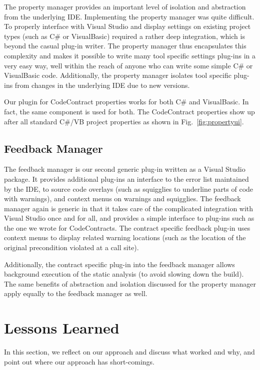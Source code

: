 \documentclass[10pt, conference, compsocconf]{IEEEtran}
\newcommand{\csharp}{C\#}
\begin{document}
The property manager provides an important level of isolation and
abstraction from the underlying IDE. Implementing the property manager
was quite difficult. To properly interface with Visual Studio and
display settings on existing project types (such as \csharp{} or
VisualBasic) required a rather deep integration, which is beyond the
casual plug-in writer. The property manager thus encapsulates this
complexity and makes it possible to write many tool specific settings
plug-ins in a very easy way, well within the reach of anyone who can
write some simple \csharp{} or VisualBasic code. Additionally, the
property manager isolates tool specific plug-ins from changes in
the underlying IDE due to new versions. 

Our plugin for CodeContract properties works for both \csharp{} and
VisualBasic. In fact, the same component is used for both.  The CodeContract
properties show up after all standard \csharp{}/VB project properties as shown in Fig.~\ref{fig:propertyui}.

\subsection{Feedback Manager}
The feedback manager is our second generic plug-in written as a Visual Studio
package. It provides additional plug-ins an interface to the error list
maintained by the IDE, to source code overlays (such as squigglies to
underline parts of code with warnings), and context menus on warnings
and squigglies. The feedback manager again is generic in that it takes
care of the complicated integration with Visual Studio once and for
all, and provides a simple interface to plug-ins such as the one we
wrote for CodeContracts. The contract specific feedback plug-in uses
context menus to display related warning locations (such as the
location of the original precondition violated at a call site). 

Additionally, the contract specific plug-in into the feedback manager
allows background execution of the static analysis (to avoid
slowing down the build). The same benefits of abstraction and
isolation discussed for the property manager apply equally to the
feedback manager as well.

\section{Lessons Learned}
\label{sec:lessons}
\noindent
In this section, we reflect on our approach and discuss what worked
and why, and point out where our approach has short-comings.
\end{document}

